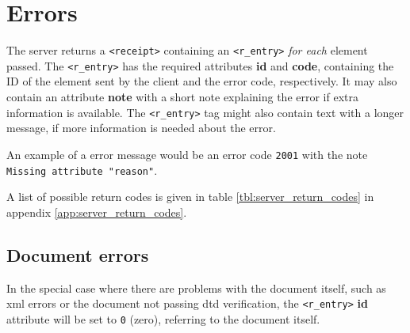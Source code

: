 \newpage
\section{Errors}
\label{sec:errors}

The server returns a \texttt{<receipt>} containing an \texttt{<r\_entry>}
\textit{for each} element passed. The \texttt{<r\_entry>} has the required
attributes \textbf{id} and \textbf{code}, containing the ID of the element sent
by the client and the error code, respectively. It may also contain an
attribute \textbf{note} with a short note explaining the error if extra
information is available. The \texttt{<r\_entry>} tag might also contain text
with a longer message, if more information is needed about the error. 

An example of a error message would be an error code \texttt{2001} with the
note \texttt{Missing attribute "reason"}.

A list of possible return codes is given in table \ref{tbl:server_return_codes}
in appendix \ref{app:server_return_codes}.

\subsection{Document errors}

In the special case where there are problems with the document itself, such as
\gls{xml} errors or the document not passing \gls{dtd} verification, the
\texttt{<r\_entry>} \textbf{id} attribute will be set to \texttt{0} (zero),
referring to the document itself. 
